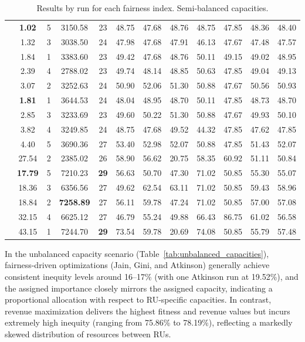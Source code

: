 \documentclass[preprint,12pt]{elsarticle}
\begin{document}
\begin{table}[htbp]
\begin{adjustbox}{max width=\textwidth}
\begin{tabular}{|c|c|c|c|c|c|c|c|c|c|c|c|}
\parbox[t]{2mm}{} & \textbf{1.02} & 5 & 3150.58 & 23 & 48.75 & 47.68 & 48.76 & 48.75 & 47.85 & 48.36 & 48.40 \\
& 1.32 & 3 & 3038.50 & 24 & 47.98 & 47.68 & 47.91 & 46.13 & 47.67 & 47.48 & 47.57 \\
& 1.84 & 1 & 3383.60 & 23 & 49.42 & 47.68 & 48.76 & 50.11 & 49.15 & 49.02 & 48.95 \\
& 2.39 & 4 & 2788.02 & 23 & 49.74 & 48.14 & 48.85 & 50.63 & 47.85 & 49.04 & 49.13 \\
& 3.07 & 2 & 3252.63 & 24 & 50.90 & 52.06 & 51.30 & 50.88 & 47.67 & 50.56 & 50.93 \\ \hline

\parbox[t]{2mm}{} & \textbf{1.81} & 1 & 3644.53 & 24 & 48.04 & 48.95 & 48.70 & 50.11 & 47.85 & 48.73 & 48.70 \\
& 2.85 & 3 & 3233.69 & 23 & 49.60 & 50.22 & 51.30 & 50.88 & 47.67 & 49.93 & 50.10 \\
& 3.82 & 4 & 3249.85 & 24 & 48.75 & 47.68 & 49.52 & 44.32 & 47.85 & 47.62 & 47.85 \\
& 4.40 & 5 & 3690.36 & 27 & 53.40 & 52.98 & 52.07 & 50.88 & 47.85 & 51.43 & 52.07 \\
& 27.54 & 2 & 2385.02 & 26 & 58.90 & 56.62 & 20.75 & 58.35 & 60.92 & 51.11 & 50.84 \\ \hline

\parbox[t]{2mm}{} & \textbf{17.79} & 5 & 7210.23 & \textbf{29} & 56.63 & 50.70 & 47.30 & 71.02 & 50.85 & 55.30 & 55.07 \\
& 18.36 & 3 & 6356.56 & 27 & 49.62 & 62.54 & 63.11 & 71.02 & 50.85 & 59.43 & 58.96 \\
& 18.84 & 2 & \textbf{7258.89} & 27 & 56.11 & 59.78 & 47.24 & 71.02 & 50.85 & 57.00 & 57.08 \\
& 32.15 & 4 & 6625.12 & 27 & 46.79 & 55.24 & 49.88 & 66.43 & 86.75 & 61.02 & 56.58 \\
& 43.15 & 1 & 7244.70 & \textbf{29} & 73.54 & 59.78 & 20.69 & 74.08 & 50.85 & 55.79 & 57.48 \\ \hline
\end{tabular}
\end{adjustbox}
\caption{Results by run for each fairness index. Semi-balanced capacities.}
\label{tab:semi_balanced_capacities}
\end{table}

In the unbalanced capacity scenario (Table~\ref{tab:unbalanced_capacities}), fairness-driven optimizations (Jain, Gini, and Atkinson) generally achieve consistent inequity levels around 16–17\% (with one Atkinson run at 19.52\%), and the assigned importance closely mirrors the assigned capacity, indicating a proportional allocation with respect to RU-specific capacities. In contrast, revenue maximization delivers the highest fitness and revenue values but incurs extremely high inequity (ranging from 75.86\% to 78.19\%), reflecting a markedly skewed distribution of resources between RUs. 
\end{document}
